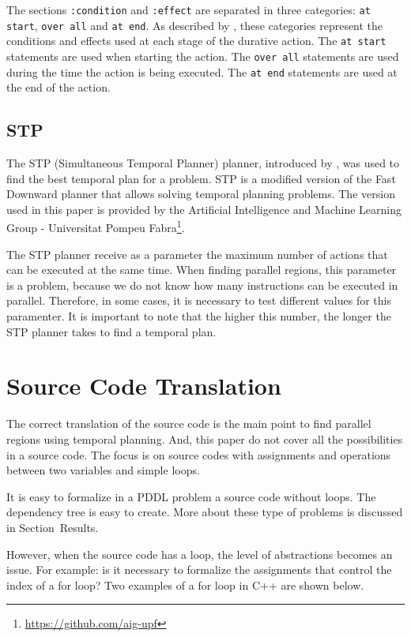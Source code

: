 \documentclass[letterpaper]{article}
\begin{document}
The sections \texttt{:condition} and \texttt{:effect} are separated in three categories: \texttt{at start}, \texttt{over all} and \texttt{at end}. As described by \cite{DBLP:series/synthesis/2019Haslum}, these categories represent the conditions and effects used at each stage of the durative action. The \texttt{at start} statements are used when starting the action. The \texttt{over all} statements are used during the time the action is being executed. The \texttt{at end} statements are used at the end of the action.

\subsection{STP}

The STP (Simultaneous Temporal Planner) planner, introduced by \cite{Blanco2018ForwardsearchTP}, was used to find the best temporal plan for a problem. STP is a modified version of the Fast Downward \cite{Helmert_2006} planner that allows solving temporal planning problems. The version used in this paper is provided by the Artificial Intelligence and Machine Learning Group - Universitat Pompeu Fabra\footnote{\href{https://github.com/aig-upf}{https://github.com/aig-upf}}.

The STP planner receive as a parameter the maximum number of actions that can be executed at the same time. When finding parallel regions, this parameter is a problem, because we do not know how many instructions can be executed in parallel. Therefore, in some cases, it is necessary to test different values for this paramenter. It is important to note that the higher this number, the longer the STP planner takes to find a temporal plan.


\section{Source Code Translation}

The correct translation of the source code is the main point to find parallel regions using temporal planning. And, this paper do not cover all the possibilities in a source code. The focus is on source codes with assignments and operations between two variables and simple loops.

It is easy to formalize in a PDDL problem a source code without loops. The dependency tree is easy to create. More about these type of problems is discussed in Section~Results.

However, when the source code has a loop, the level of abstractions becomes an issue. For example: is it necessary to formalize the assignments that control the index of a for loop? Two examples of a for loop in C++ are shown below.
\end{document}
